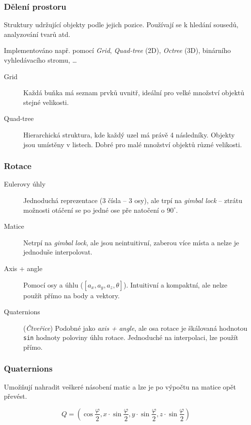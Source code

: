 \medskip

\subsubsection*{Dělení prostoru}

Struktury udržující objekty podle jejich pozice.
Používají se k hledání sousedů, analyzování tvarů atd.

Implementováno např. pomocí \textit{Grid}, \textit{Quad-tree} (2D), \textit{Octree} (3D), binárního vyhledávacího stromu, \dots

\begin{description}
    \item[Grid] Každá buňka má seznam prvků uvnitř, ideální pro velké množství objektů stejné velikosti.
    \item[Quad-tree] Hierarchická struktura, kde každý uzel má právě 4 následníky. Objekty jsou umístěny v listech. Dobré pro malé množství objektů různé velikosti. 
\end{description}

\subsubsection*{Rotace}

\begin{description}
    \item[Eulerovy úhly] Jednoduchá reprezentace (3 čísla -- 3 osy), ale trpí na \textit{gimbal lock} -- ztrátu možnosti otáčení se po jedné ose pře natočení o \(90^\circ\).
    \item[Matice] Netrpí na \textit{gimbal lock}, ale jsou neintuitivní, zaberou více místa a nelze je jednoduše interpolovat.
    \item[Axis + angle] Pomocí osy a úhlu (\([a_x, a_y, a_z, \theta]\)). Intuitivní a kompaktní, ale nelze použít přímo na body a vektory.
    \item[Quaternions] (\textit{Čtveřice}) Podobné jako \textit{axis + angle}, ale osa rotace je škálovaná hodnotou \texttt{sin} hodnoty poloviny úhlu rotace. Jednoduché na interpolaci, lze použít přímo.
\end{description}

\subsubsection*{Quaternions}

Umožňují nahradit veškeré násobení matic a lze je po výpočtu na matice opět převést.

\[
    Q = (\cos{\frac{\varphi}{2}}, x \cdot \sin{\frac{\varphi}{2}}, y \cdot \sin{\frac{\varphi}{2}}, z \cdot \sin{\frac{\varphi}{2}})
\]




